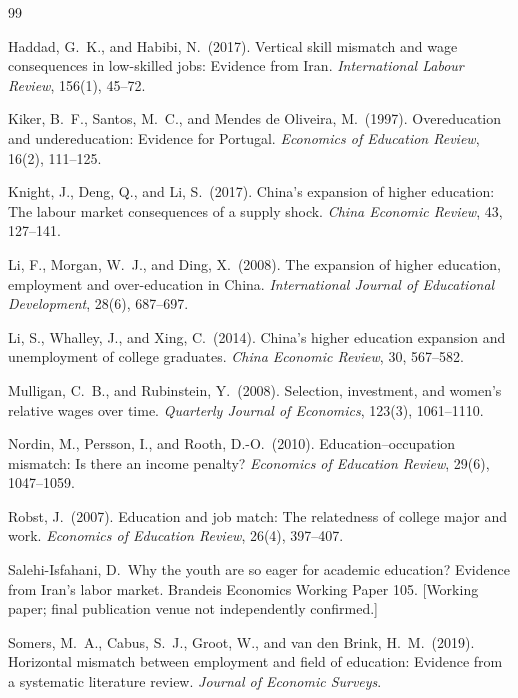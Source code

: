 \documentclass[11pt]{article}
\begin{document}

\begin{thebibliography}{99}

Haddad, G.\ K., and Habibi, N.\ (2017). Vertical skill mismatch and wage consequences in low-skilled jobs: Evidence from Iran. \emph{International Labour Review}, 156(1), 45--72.

Kiker, B.\ F., Santos, M.\ C., and Mendes de Oliveira, M.\ (1997). Overeducation and undereducation: Evidence for Portugal. \emph{Economics of Education Review}, 16(2), 111--125.

Knight, J., Deng, Q., and Li, S.\ (2017). China's expansion of higher education: The labour market consequences of a supply shock. \emph{China Economic Review}, 43, 127--141.

Li, F., Morgan, W.\ J., and Ding, X.\ (2008). The expansion of higher education, employment and over-education in China. \emph{International Journal of Educational Development}, 28(6), 687--697.

Li, S., Whalley, J., and Xing, C.\ (2014). China's higher education expansion and unemployment of college graduates. \emph{China Economic Review}, 30, 567--582.

Mulligan, C.\ B., and Rubinstein, Y.\ (2008). Selection, investment, and women's relative wages over time. \emph{Quarterly Journal of Economics}, 123(3), 1061--1110.

Nordin, M., Persson, I., and Rooth, D.-O.\ (2010). Education--occupation mismatch: Is there an income penalty? \emph{Economics of Education Review}, 29(6), 1047--1059.

Robst, J.\ (2007). Education and job match: The relatedness of college major and work. \emph{Economics of Education Review}, 26(4), 397--407.

Salehi-Isfahani, D.\ Why the youth are so eager for academic education? Evidence from Iran's labor market. Brandeis Economics Working Paper 105. [Working paper; final publication venue not independently confirmed.]

Somers, M.\ A., Cabus, S.\ J., Groot, W., and van den Brink, H.\ M.\ (2019). Horizontal mismatch between employment and field of education: Evidence from a systematic literature review. \emph{Journal of Economic Surveys}.


\end{thebibliography}
\end{document}
